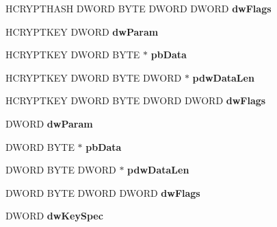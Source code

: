 \begin{DoxyCompactItemize}
H\+C\+R\+Y\+P\+T\+H\+A\+SH D\+W\+O\+RD B\+Y\+TE D\+W\+O\+RD D\+W\+O\+RD {\bfseries dw\+Flags}
\item 
\mbox{\label{structtag_p_r_o_v_f_u_n_c_s_aa046c4e61456cca02f90285075697b6d}} 
H\+C\+R\+Y\+P\+T\+K\+EY D\+W\+O\+RD {\bfseries dw\+Param}
\item 
\mbox{\label{structtag_p_r_o_v_f_u_n_c_s_a14b50138a243e3997a90f9d30df8bad2}} 
H\+C\+R\+Y\+P\+T\+K\+EY D\+W\+O\+RD B\+Y\+TE $\ast$ {\bfseries pb\+Data}
\item 
\mbox{\label{structtag_p_r_o_v_f_u_n_c_s_a05d1fc208dbbe2197955562d08934def}} 
H\+C\+R\+Y\+P\+T\+K\+EY D\+W\+O\+RD B\+Y\+TE D\+W\+O\+RD $\ast$ {\bfseries pdw\+Data\+Len}
\item 
\mbox{\label{structtag_p_r_o_v_f_u_n_c_s_ad9d4020ac4833262b112ae87c66e27ef}} 
H\+C\+R\+Y\+P\+T\+K\+EY D\+W\+O\+RD B\+Y\+TE D\+W\+O\+RD D\+W\+O\+RD {\bfseries dw\+Flags}
\item 
\mbox{\label{structtag_p_r_o_v_f_u_n_c_s_a4bb6f301be69df4ed5e2ee2bf1b8499b}} 
D\+W\+O\+RD {\bfseries dw\+Param}
\item 
\mbox{\label{structtag_p_r_o_v_f_u_n_c_s_abdcb3b5fed99c11c956ea12ea658512a}} 
D\+W\+O\+RD B\+Y\+TE $\ast$ {\bfseries pb\+Data}
\item 
\mbox{\label{structtag_p_r_o_v_f_u_n_c_s_a0a2e04f0b9fde59e58b2cd4f404b2613}} 
D\+W\+O\+RD B\+Y\+TE D\+W\+O\+RD $\ast$ {\bfseries pdw\+Data\+Len}
\item 
\mbox{\label{structtag_p_r_o_v_f_u_n_c_s_aebe54638ef42c2e66ea43fe69733d5e7}} 
D\+W\+O\+RD B\+Y\+TE D\+W\+O\+RD D\+W\+O\+RD {\bfseries dw\+Flags}
\item 
\mbox{\label{structtag_p_r_o_v_f_u_n_c_s_acc530b664868ff014483dd35a35be920}} 
D\+W\+O\+RD {\bfseries dw\+Key\+Spec}
\item 
\mbox{\label{structtag_p_r_o_v_f_u_n_c_s_a81f662b6a3318ba75c812b924bb283f6}} 

\end{DoxyCompactItemize}
